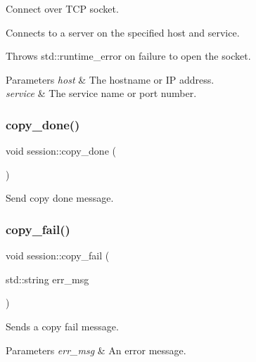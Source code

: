 Connect over T\+CP socket. 

Connects to a server on the specified host and service.

Throws std\+::runtime\+\_\+error on failure to open the socket. 
\begin{DoxyParams}{Parameters}
{\em host} & The hostname or IP address. \\
\hline
{\em service} & The service name or port number. \\
\hline
\end{DoxyParams}
\mbox{\label{classsession_a93ca7183c84d3f7734b0dac2794a8e9d}} 
\subsubsection{\texorpdfstring{copy\+\_\+done()}{copy\_done()}}
{\footnotesize\ttfamily void session\+::copy\+\_\+done (\begin{DoxyParamCaption}{ }\end{DoxyParamCaption})\hspace{0.3cm}{\ttfamily [inline]}}



Send copy done message. 

\mbox{\label{classsession_a41025799ee51c579959d7ef7ea3095d4}} 
\subsubsection{\texorpdfstring{copy\+\_\+fail()}{copy\_fail()}}
{\footnotesize\ttfamily void session\+::copy\+\_\+fail (\begin{DoxyParamCaption}\item[{std\+::string}]{err\+\_\+msg }\end{DoxyParamCaption})\hspace{0.3cm}{\ttfamily [inline]}}



Sends a copy fail message. 


\begin{DoxyParams}{Parameters}
{\em err\+\_\+msg} & An error message. \\
\hline
\end{DoxyParams}
\mbox{\label{classsession_ab8aef6650e04d8c91bc6ab0b00bb3a81}} 
